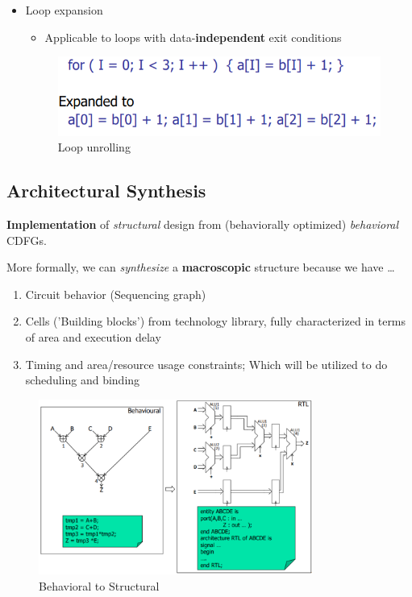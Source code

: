 \documentclass{article}
\begin{document}
\begin{itemize}
    \item Loop expansion
        \begin{itemize}
            \item Applicable to loops with data-\textbf{independent} exit conditions
        \end{itemize}
        \begin{figure}[htp]
            \centering
            \includegraphics[width=11cm, scale=1]{S2/loopExpansion.PNG}
            \caption{Loop unrolling}
        \end{figure}
\end{itemize}

\subsection{Architectural Synthesis}
\textbf{Implementation} of \textit{structural} design from (behaviorally optimized) \textit{behavioral} CDFGs.

More formally, we can \textit{synthesize} a \textbf{macroscopic} structure because we have \dots
\begin{enumerate}
    \item Circuit behavior (Sequencing graph)
    \item Cells ('Building blocks') from technology library, fully characterized in terms of area and execution delay
    \item Timing and area/resource usage constraints; Which will be utilized to do scheduling and binding
\end{enumerate}

\begin{figure}[htp]
    \centering
    \includegraphics[width=9cm, scale=1]{S2/architecturalSynthesis.PNG}
    \caption{Behavioral to Structural}
\end{figure}
\end{document}
